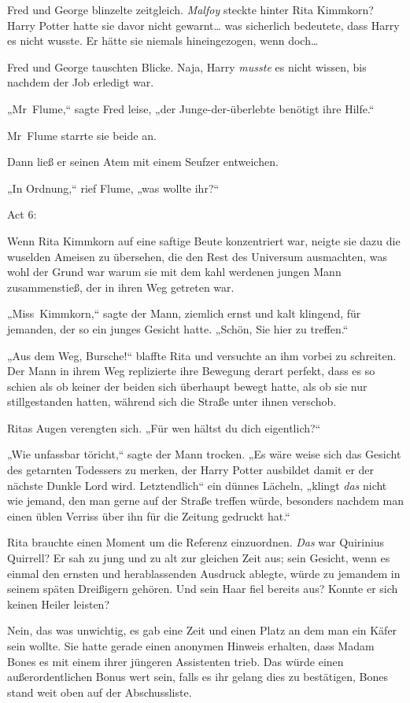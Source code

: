 {Fred und George blinzelte zeitgleich. \emph{Malfoy} steckte hinter Rita Kimmkorn? Harry Potter hatte sie davor nicht gewarnt… was sicherlich bedeutete, dass Harry es nicht wusste. Er hätte sie niemals hineingezogen, wenn doch…

Fred und George tauschten Blicke. Naja, Harry \emph{musste} es nicht wissen, bis nachdem der Job erledigt war.

„Mr~Flume,“ sagte Fred leise, „der Junge-der-überlebte benötigt ihre Hilfe.“

Mr~Flume starrte sie beide an.

Dann ließ er seinen Atem mit einem Seufzer entweichen.

„In Ordnung,“ rief Flume, „was wollte ihr?“

Act 6:

Wenn Rita Kimmkorn auf eine saftige Beute konzentriert war, neigte sie dazu die wuselden Ameisen zu übersehen, die den Rest des Universum ausmachten, was wohl der Grund war warum sie mit dem kahl werdenen jungen Mann zusammenstieß, der in ihren Weg getreten war.

„Miss~Kimmkorn,“ sagte der Mann, ziemlich ernst und kalt klingend, für jemanden, der so ein junges Gesicht hatte. „Schön, Sie hier zu treffen.“

„Aus dem Weg, Bursche!“ blaffte Rita und versuchte an ihm vorbei zu schreiten. Der Mann in ihrem Weg replizierte ihre Bewegung derart perfekt, dass es so schien als ob keiner der beiden sich überhaupt bewegt hatte, als ob sie nur stillgestanden hatten, während sich die Straße unter ihnen verschob.

Ritas Augen verengten sich. „Für wen hältst du dich eigentlich?“

„Wie unfassbar töricht,“ sagte der Mann trocken. „Es wäre weise sich das Gesicht des getarnten Todessers zu merken, der Harry Potter ausbildet damit er der nächste Dunkle Lord wird. Letztendlich“ ein dünnes Lächeln, „klingt \emph{das} nicht wie jemand, den man gerne auf der Straße treffen würde, besonders nachdem man einen üblen Verriss über ihn für die Zeitung gedruckt hat.“

Rita brauchte einen Moment um die Referenz einzuordnen. \emph{Das} war Quirinius Quirrell? Er sah zu jung und zu alt zur gleichen Zeit aus; sein Gesicht, wenn es einmal den ernsten und herablassenden Ausdruck ablegte, würde zu jemandem in seinem späten Dreißigern gehören. Und sein Haar fiel bereits aus? Konnte er sich keinen Heiler leisten?

Nein, das was unwichtig, es gab eine Zeit und einen Platz an dem man ein Käfer sein wollte. Sie hatte gerade einen anonymen Hinweis erhalten, dass Madam Bones es mit einem ihrer jüngeren Assistenten trieb. Das würde einen außerordentlichen Bonus wert sein, falls es ihr gelang dies zu bestätigen, Bones stand weit oben auf der Abschussliste.

}
